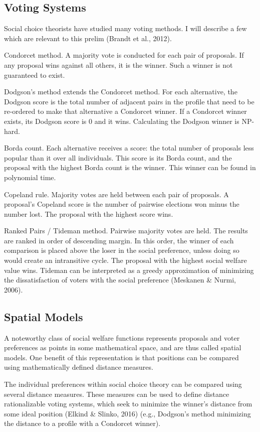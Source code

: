 \subsection{Voting Systems}
Social choice theorists have studied many voting methods. I will describe a few which are relevant to this prelim (Brandt et al., 2012).

Condorcet method. A majority vote is conducted for each pair of proposals. If any proposal wins against all others, it is the winner. Such a winner is not guaranteed to exist.

Dodgson's method extends the Condorcet method. For each alternative, the Dodgson score is the total number of adjacent pairs in the profile that need to be re-ordered to make that alternative a Condorcet winner. If a Condorcet winner exists, its Dodgson score is 0 and it wins. Calculating the Dodgson winner is NP-hard.

Borda count. Each alternative receives a score: the total number of proposals less popular than it over all individuals. This score is its Borda count, and the proposal with the highest Borda count is the winner. This winner can be found in polynomial time.

Copeland rule. Majority votes are held between each pair of proposals. A proposal's Copeland score is the number of pairwise elections won minus the number lost. The proposal with the highest score wins.

Ranked Pairs / Tideman method. Pairwise majority votes are held. The results are ranked in order of descending margin. In this order, the winner of each comparison is placed above the loser in the social preference, unless doing so would create an intransitive cycle. The proposal with the highest social welfare value wins. Tideman can be interpreted as a greedy approximation of minimizing the dissatisfaction of voters with the social preference (Meskanen \& Nurmi, 2006).

\subsection{Spatial Models}
A noteworthy class of social welfare functions represents proposals and voter preferences as points in some mathematical space, and are thus called spatial models. One benefit of this representation is that positions can be compared using mathematically defined distance measures.

The individual preferences within social choice theory can be compared using several distance measures. These measures can be used to define distance rationalizable voting systems, which seek to minimize the winner's distance from some ideal position (Elkind \& Slinko, 2016) (e.g., Dodgson's method minimizing the distance to a profile with a Condorcet winner).

